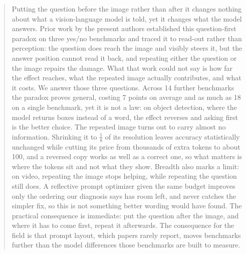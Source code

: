 \begin{abstract}
Putting the question before the image rather than after it changes nothing about
what a vision-language model is told, yet it changes what the model answers.
Prior work by the present authors established this question-first paradox on
three yes/no benchmarks and traced it to read-out rather than perception: the
question does reach the image and visibly steers it, but the answer position
cannot read it back, and repeating either the question or the image repairs the
damage. What that work could not say is how far the effect reaches, what the
repeated image actually contributes, and what it costs. We answer those three
questions. Across 14 further benchmarks the paradox proves general, costing 7 points on
average and as much as 18 on a single benchmark,
yet it is not a law: on object detection, where the model returns boxes instead
of a word, the effect reverses and asking first is the better choice. The
repeated image turns out to carry almost no information. Shrinking it to $\tfrac{1}{8}$ of its resolution leaves accuracy statistically unchanged while cutting
its price from thousands of extra tokens to about 100, and a reversed copy
works as well as a correct one, so what matters is where the tokens sit and not
what they show. Breadth also marks a limit: on video, repeating the image stops
helping, while repeating the question still does. A reflective prompt optimizer given the same budget improves
only the ordering our diagnosis says has room left, and never catches the
simpler fix, so this is not something better wording would have found. The
practical consequence is immediate: put the question after the image, and where
it has to come first, repeat it afterwards. The consequence for the field is
that prompt layout, which papers rarely report, moves benchmarks further than
the model differences those benchmarks are built to measure.
\end{abstract}
